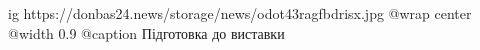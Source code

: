  
 
 
 
 

\ifcmt
  ig https://donbas24.news/storage/news/odot43ragfbdrisx.jpg
  @wrap center
  @width 0.9
	@caption Підготовка до виставки
\fi

